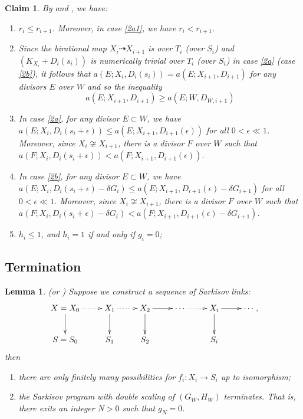 \documentclass[11pt]{amsart}
\newtheorem{lem}[defn]{Lemma}
\newtheorem{claim}[defn]{Claim}
\begin{document}
\begin{claim}\label{behavior2}
By \cite[Lemma 13.14-17]{haconMinimalModelProgram2012} and \cite[Lemma 4.2]{liuSarkisovProgramGeneralized2021}, we have:
  \begin{enumerate}
    \item $r_{i}\leqslant r_{i+1}$. Moreover, in case \ref{2a1}, we have $r_{i}<r_{i+1}$. 
    \item Since the birational map $X_{i}\dashrightarrow X_{i+1}$ is over $T_{i}$ (over $S_{i}$) and $(K_{X_{i}}+D_{i}(s_{i}))$ is numerically trivial over $T_{i}$ (over $S_{i}$) in case \ref{2a} (case \ref{2b}), it follows that $a(E;X_{i},D_{i}(s_{i}))= a(E;X_{i+1},D_{i+1})$ for any divisors $E$ over $W$ and so the inequality
    \[
      a(E;X_{i+1},D_{i+1})\geqslant a(E;W,D_{W,i+1})
    \]
  \item\label{2adicrepancy}  In case \ref{2a}, for any divisor $E \subset W$, we have $a(E;X_{i},D_{i}(s_{i}+\epsilon))\leqslant a(E;X_{i+1},D_{i+1}(\epsilon))$ for all $0<\epsilon\ll 1$. Moreover, since $X_{i} \not\cong X_{i+1}$, there is a divisor $F$ over $W$ such that  $a(F;X_{i},D_{i}(s_{i}+\epsilon))< a(F;X_{i+1},D_{i+1}(\epsilon))$.

  \item\label{2bdiscrepancy}   In case \ref{2b}, for any divisor $E \subset W$, we have $a(E;X_{i},D_{i}(s_{i}+\epsilon)-\delta G_{i})\leqslant a(E;X_{i+1},D_{i+1}(\epsilon)-\delta G_{i+1})$ for all $0<\epsilon\ll 1$. Moreover, since $X_{i} \not\cong X_{i+1}$, there is a divisor $F$ over $W$ such that  $a(F;X_{i},D_{i}(s_{i}+\epsilon)-\delta G_{i})< a(F;X_{i+1},D_{i+1}(\epsilon)-\delta G_{i+1})$.
  \item  $h_{i}\leqslant 1$, and $h_{i}=1$ if and only if $g_{i}=0$;
  \end{enumerate}
\end{claim}
\subsection{Termination}
\begin{lem}\label{termination2}
\cite[Lemma 13.18-19]{haconMinimalModelProgram2012} (or \cite[Lemma 4.9]{liuSarkisovProgramGeneralized2021}) Suppose we construct a sequence of Sarkisov links: 
\[
  \xymatrix{
    X=X_0\ar@{.>}[r]\ar[d]&X_{1}\ar@{.>}[r]\ar[d]& X_{2}\ar[d]\ar[r] &\cdots\ar@{.>}[r]&X_{i}\ar[d] \ar[r] &\cdots\\
    S=S_{0}&S_{1} &S_{2}&&S_{i}
  }
,\]
then
  \begin{enumerate}
    \item there are only finitely many possibilities for $f_{i}:X_{i}\to S_{i}$ up to isomorphism;
    \item the Sarkisov program with double scaling of $(G_{W},H_{W})$ terminates. That is, there exits an integer $N>0$ such that $g_{N}=0$.  
  \end{enumerate}
\end{lem}
\end{document}
